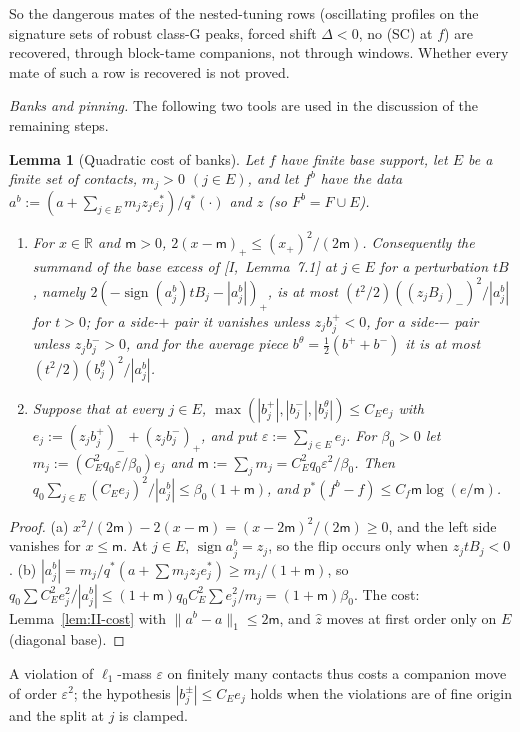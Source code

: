 \documentclass[10pt]{amsart}
\newtheorem{lemma}[theorem]{Lemma}
\theoremstyle{definition}
\theoremstyle{remark}
\newcommand{\sgn}{\operatorname{sign}}
\newcommand{\R}{\mathbb R}
\newcommand{\zh}{\hat z}
\begin{document}
So the dangerous mates of the nested-tuning rows (oscillating profiles on the
signature sets of robust class-G peaks, forced shift $\Delta<0$, no (SC) at $f$) are
recovered, through block-tame companions, not through windows.  Whether every
mate of such a row is recovered is not proved.

\smallskip\noindent\emph{Banks and pinning.}  The following two tools are used in the
discussion of the remaining steps.

\begin{lemma}[Quadratic cost of banks]\label{lem:II-QB2}
Let $f$ have finite base support, let $E$ be a finite set of contacts, $m_j>0$
$(j\in E)$, and let $f^b$ have the data $a^b:=(a+\sum_{j\in E}m_jz_je_j^*)/q^*(\cdot)$ and
$z$ \textup{(}so $F^b=F\cup E$\textup{)}.
\begin{enumerate}
\item[(a)] For $x\in\R$ and $\mathsf m>0$, $2(x-\mathsf m)_+\le(x_+)^2/(2\mathsf m)$.  Consequently the
summand of the base excess of [I,~Lemma~7.1] at $j\in E$ for a perturbation $tB$,
namely $2(-\sgn(a^b_j)tB_j-|a^b_j|)_+$, is at most $(t^2/2)((z_jB_j)_-)^2/|a^b_j|$ for $t>0$;
for a side-$+$ pair it vanishes unless $z_jb^+_j<0$, for a side-$-$ pair unless
$z_jb^-_j>0$, and for the average piece $b^\theta=\frac12(b^++b^-)$ it is at most
$(t^2/2)(b^\theta_j)^2/|a^b_j|$.
\item[(b)] Suppose that at every $j\in E$, $\max(|b^+_j|,|b^-_j|,|b^\theta_j|)\le C_Ee_j$ with
$e_j:=(z_jb^+_j)_-+(z_jb^-_j)_+$, and put $\varepsilon:=\sum_{j\in E}e_j$.  For $\beta_0>0$ let
$m_j:=(C_E^2q_0\varepsilon/\beta_0)e_j$ and $\mathsf m:=\sum_jm_j=C_E^2q_0\varepsilon^2/\beta_0$.  Then
$q_0\sum_{j\in E}(C_Ee_j)^2/|a^b_j|\le\beta_0(1+\mathsf m)$, and $p^*(f^b-f)\le C_f\mathsf m\log(e/\mathsf
m)$.
\end{enumerate}
\end{lemma}

\begin{proof}
(a) $x^2/(2\mathsf m)-2(x-\mathsf m)=(x-2\mathsf m)^2/(2\mathsf m)\ge0$, and the left side vanishes for
$x\le\mathsf m$.  At $j\in E$, $\sgn a^b_j=z_j$, so the flip occurs only when $z_jtB_j<0$.
(b) $|a^b_j|=m_j/q^*(a+\sum m_jz_je^*_j)\ge m_j/(1+\mathsf m)$, so $q_0\sum C_E^2e_j^2/|a^b_j|\le
(1+\mathsf m)q_0C_E^2\sum e_j^2/m_j=(1+\mathsf m)\beta_0$.  The cost: Lemma~\ref{lem:II-cost} with
$\|a^b-a\|_1\le2\mathsf m$, and $\zh$ moves at first order only on $E$ (diagonal base).
\end{proof}

A violation of $\ell_1$-mass $\varepsilon$ on finitely many contacts thus costs a
companion move of order $\varepsilon^2$; the hypothesis $|b^\pm_j|\le C_Ee_j$ holds when the
violations are of fine origin and the split at $j$ is clamped.
\end{document}

